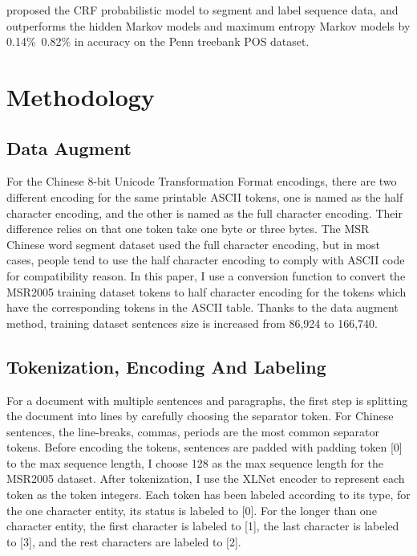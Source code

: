 \documentclass[11pt,a4paper]{article}
\begin{document}
  \citet{Lafferty2001Conditional} proposed the CRF probabilistic model to segment and label sequence data, and outperforms the hidden Markov models and maximum entropy Markov models by 0.14\%~0.82\% in accuracy on the Penn treebank POS dataset.


\section{Methodology}
\label{sec:hireachy}

\subsection{Data Augment}

For the Chinese 8-bit Unicode Transformation Format encodings, there are two different encoding for the same printable ASCII tokens, one is named as the half character encoding,
and the other is named as the full character encoding.
Their difference relies on that one token take one byte or three bytes.
The MSR Chinese word segment dataset\citet{emerson2005second} used the full character encoding, but in most cases,
people tend to use the half character encoding to comply with ASCII code for compatibility reason.
In this paper, I use a conversion function to convert the MSR2005 training dataset tokens to half character encoding for the tokens which have the corresponding tokens in the ASCII table.
Thanks to the data augment method, training dataset sentences size is increased from 86,924 to 166,740.

\subsection{Tokenization, Encoding And Labeling}

For a document with multiple sentences and paragraphs, the first step is splitting the document into lines by carefully choosing the separator token.
For Chinese sentences, the line-breaks, commas, periods are the most common separator tokens.
Before encoding the tokens, sentences are padded with padding token [0] to the max sequence length, I choose 128 as the max sequence length for the MSR2005 dataset.
After tokenization, I use the XLNet encoder to represent each token as the token integers.
Each token has been labeled according to its type, for the one character entity, its status is labeled to [0].
For the longer than one character entity, the first character is labeled to [1], the last character is labeled to [3], and the rest characters are labeled to [2].
\end{document}
